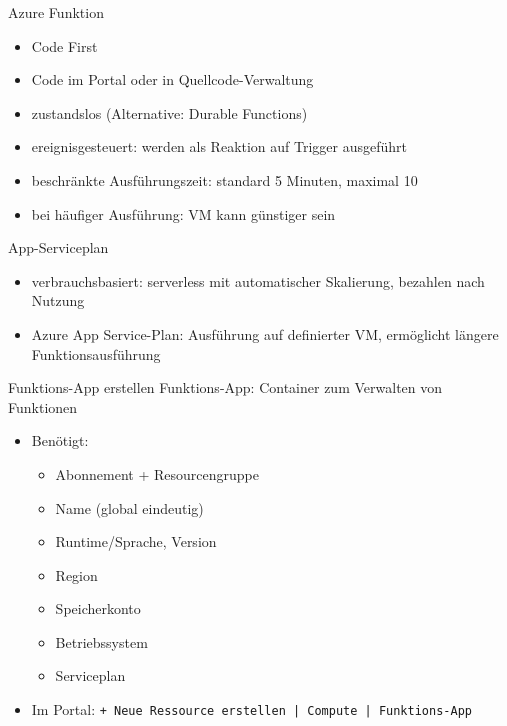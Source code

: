 \begin{flashcard}[Definition]{Azure Funktion}
    \begin{itemize}
        \item Code First
        \item Code im Portal oder in Quellcode-Verwaltung
        \item zustandslos (Alternative: Durable Functions)
        \item ereignisgesteuert: werden als Reaktion auf Trigger ausgeführt
        \item beschränkte Ausführungszeit: standard 5 Minuten, maximal 10
        \item bei häufiger Ausführung: VM kann günstiger sein
    \end{itemize}
\end{flashcard}

\begin{flashcard}[Definition]{App-Serviceplan}
    \begin{itemize}
        \item verbrauchsbasiert: serverless mit automatischer Skalierung, bezahlen nach Nutzung
        \item Azure App Service-Plan: Ausführung auf definierter VM, ermöglicht längere Funktionsausführung
    \end{itemize}
\end{flashcard}

\begin{flashcard}[Definition]{Funktions-App erstellen}
    Funktions-App: Container zum Verwalten von Funktionen
    \begin{itemize}
        \item Benötigt:
            \begin{itemize}
                \item Abonnement + Resourcengruppe
                \item Name (global eindeutig)
                \item Runtime/Sprache, Version
                \item Region
                \item Speicherkonto
                \item Betriebssystem
                \item Serviceplan
            \end{itemize}
        \item Im Portal: \texttt{+ Neue Ressource erstellen | Compute | Funktions-App}
    \end{itemize}
\end{flashcard}

